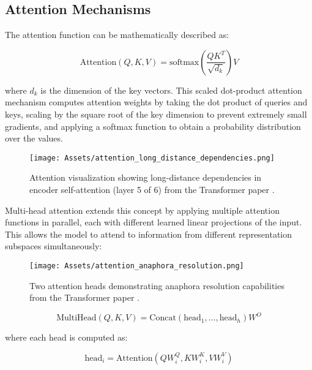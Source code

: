 \subsection{Attention Mechanisms}

The attention function can be mathematically described as:

\begin{equation}
\text{Attention}(Q, K, V) = \text{softmax}\left(\frac{QK^T}{\sqrt{d_k}}\right)V
\end{equation}

where $d_k$ is the dimension of the key vectors. This scaled dot-product attention mechanism computes attention weights by taking the dot product of queries and keys, scaling by the square root of the key dimension to prevent extremely small gradients, and applying a softmax function to obtain a probability distribution over the values.

\begin{figure}[H]
    \centering
    \texttt{[image: Assets/attention\_long\_distance\_dependencies.png]}
    \caption{Attention visualization showing long-distance dependencies in encoder self-attention (layer 5 of 6) from the Transformer paper \cite{AttentionIsAllYouNeed}.}
    \label{fig:attention_long_distance}
\end{figure}

Multi-head attention extends this concept by applying multiple attention functions in parallel, each with different learned linear projections of the input. This allows the model to attend to information from different representation subspaces simultaneously:

\begin{figure}[H]
    \centering
    \texttt{[image: Assets/attention\_anaphora\_resolution.png]}
    \caption{Two attention heads demonstrating anaphora resolution capabilities from the Transformer paper \cite{AttentionIsAllYouNeed}.}
    \label{fig:attention_anaphora}
\end{figure}

\begin{equation}
\text{MultiHead}(Q, K, V) = \text{Concat}(\text{head}_1, ..., \text{head}_h)W^O
\end{equation}

where each head is computed as:

\begin{equation}
\text{head}_i = \text{Attention}(QW_i^Q, KW_i^K, VW_i^V)
\end{equation}


